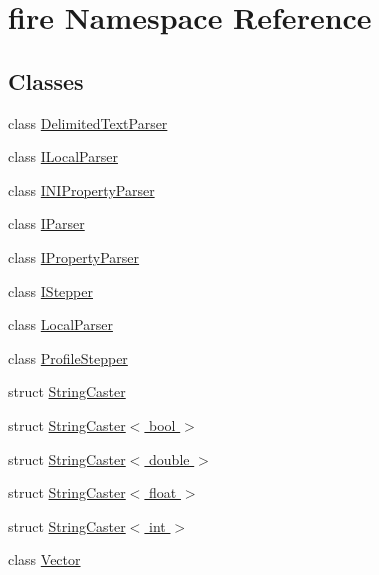 \hypertarget{a00085}{}\section{fire Namespace Reference}
\label{a00085}
\subsection*{Classes}
\begin{DoxyCompactItemize}
\item 
class \hyperlink{a00008}{Delimited\+Text\+Parser}
\item 
class \hyperlink{a00012}{I\+Local\+Parser}
\item 
class \hyperlink{a00013}{I\+N\+I\+Property\+Parser}
\item 
class \hyperlink{a00014}{I\+Parser}
\item 
class \hyperlink{a00015}{I\+Property\+Parser}
\item 
class \hyperlink{a00016}{I\+Stepper}
\item 
class \hyperlink{a00019}{Local\+Parser}
\item 
class \hyperlink{a00021}{Profile\+Stepper}
\item 
struct \hyperlink{a00029}{String\+Caster}
\item 
struct \hyperlink{a00030}{String\+Caster$<$ bool $>$}
\item 
struct \hyperlink{a00031}{String\+Caster$<$ double $>$}
\item 
struct \hyperlink{a00032}{String\+Caster$<$ float $>$}
\item 
struct \hyperlink{a00033}{String\+Caster$<$ int $>$}
\item 
class \hyperlink{a00037}{Vector}
\end{DoxyCompactItemize}

